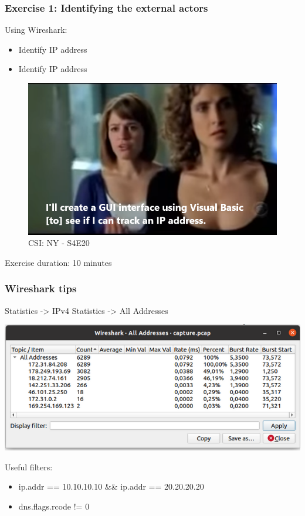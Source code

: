 \begin{frame}
    \frametitle{Exercise 1: Identifying the external actors }
    Using Wireshark:
    \begin{itemize}
    	\item Identify {\color{green}{\bf Player}} IP address
    	\item Identify {\color{red}{\bf Attacker}} IP address
    \end{itemize}
    \begin{figure}
		\includegraphics[scale=0.45]{../pictures/csi-meme.png}
		\caption[csi]{CSI: NY - S4E20}
    \end{figure}
    \begin{center}Exercise duration: 10 minutes\end{center}
\end{frame}

\begin{frame}
    \frametitle{Wireshark tips}
    Statistics -> IPv4 Statistics -> All Addresses
	\begin{center}\includegraphics[scale=0.45]{../pictures/wireshark-statistics.png}\end{center}
	Useful filters:
    \begin{itemize}
    	\item ip.addr == 10.10.10.10 \&\& ip.addr == 20.20.20.20
    	\item dns.flags.rcode != 0
    \end{itemize}
\end{frame}

